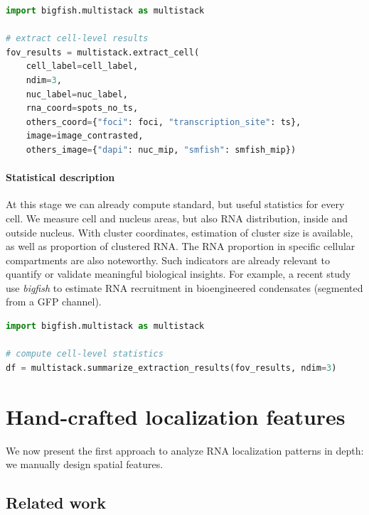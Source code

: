 \begin{minipage}{0.9\textwidth}
\begin{lstlisting}[language=Python]
import bigfish.multistack as multistack

# extract cell-level results
fov_results = multistack.extract_cell(
    cell_label=cell_label,
    ndim=3,
    nuc_label=nuc_label,
    rna_coord=spots_no_ts,
    others_coord={"foci": foci, "transcription_site": ts},
    image=image_contrasted,
    others_image={"dapi": nuc_mip, "smfish": smfish_mip})
\end{lstlisting}
\end{minipage}

\paragraph{Statistical description}

At this stage we can already compute standard, but useful statistics for every cell.
We measure cell and nucleus areas, but also \ac{RNA} distribution, inside and outside nucleus.
With cluster coordinates, estimation of cluster size is available, as well as proportion of clustered \ac{RNA}.
The \ac{RNA} proportion in specific cellular compartments are also noteworthy.
Such indicators are already relevant to quantify or validate meaningful biological insights.
For example, a recent study~\cite{cochard_rna_2022} use \emph{bigfish} to estimate \ac{RNA} recruitment in bioengineered condensates (segmented from a \ac{GFP} channel).\\

\begin{minipage}{0.9\textwidth}
\begin{lstlisting}[language=Python]
import bigfish.multistack as multistack

# compute cell-level statistics
df = multistack.summarize_extraction_results(fov_results, ndim=3)
\end{lstlisting}
\end{minipage}

\section{Hand-crafted localization features} \label{sec:hand_features}

We now present the first approach to analyze \ac{RNA} localization patterns in depth: we manually design spatial features.

\subsection{Related work} \label{subsec:related_work_hand_features}

